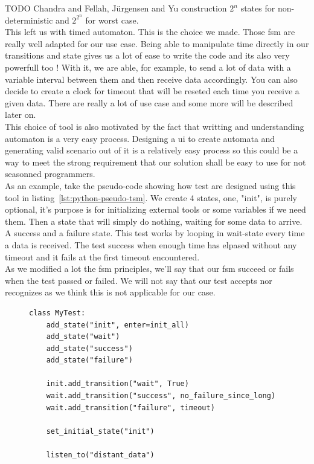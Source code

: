 \documentclass[12pt]{article}
\begin{document}
TODO Chandra and Fellah, Jürgensen and Yu construction $2^n$ states for non-deterministic and $2^{2^n}$ for worst case.\\

This left us with timed automaton. This is the choice we made. Those \gls{fsm} are really well adapted for our use case. Being able to manipulate time directly in our transitions and state gives us a lot of ease to write the code and its also very powerfull too ! With it, we are able, for example, to send a lot of data with a variable interval between them and then receive data accordingly. You can also decide to create a clock for timeout that will be reseted each time you receive a given data. There are really a lot of use case and some more will be described later on.\\

This choice of tool is also motivated by the fact that writting and understanding automaton is a very easy process. Designing a \gls{ui} to create automata and generating valid scenario out of it is a relatively easy process so this could be a way to meet the strong requirement that our solution shall be easy to use for not seasonned programmers.\\

As an example, take the pseudo-code showing how test are designed using this tool in listing~\ref{lst:python-pseudo-tsm}. We create 4 states, one, "init", is purely optional, it's purpose is for initializing external tools or some variables if we need them. Then a state that will simply do nothing, waiting for some data to arrive. A success and a failure state. This test works by looping in wait-state every time a data is received. The test success when enough time has elpased without any timeout and it fails at the first timeout encountered.\\

As we modified a lot the \gls{fsm} principles, we'll say that our \gls{fsm} succeed or fails when the test passed or failed. We will not say that our test accepts nor recognizes as we think this is not applicable for our case.

\begin{figure}
    \label{python-pseudo-tsm}
    \begin{lstlisting}[frame=single,caption="Pseudo test case example",label={lst:python-pseudo-tsm}]
class MyTest:
    add_state("init", enter=init_all)
    add_state("wait")
    add_state("success")
    add_state("failure")

    init.add_transition("wait", True)
    wait.add_transition("success", no_failure_since_long)
    wait.add_transition("failure", timeout)

    set_initial_state("init")

    listen_to("distant_data")
    \end{lstlisting}
\end{figure}
\end{document}
